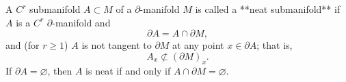 A $C^r$ submanifold $A \subset M$ of a $\partial$-manifold $M$ is called a **neat submanifold** if $A$ is a $C^r$ $\partial$-manifold and
$$\partial A = A \cap \partial M,$$
and (for $r \geq 1$) $A$ is not tangent to $\partial M$ at any point $x \in \partial A$; that is,
$$A_x \not\subset (\partial M)_x.$$
If $\partial A = \varnothing$, then $A$ is neat if and only if $A \cap \partial M = \varnothing$.
